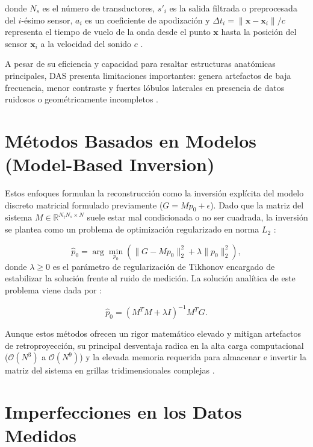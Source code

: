 donde $N_s$ es el número de transductores, $s'_i$ es la salida filtrada o preprocesada del $i$-ésimo sensor, $a_i$ es un coeficiente de apodización y $\Delta t_i = \|\mathbf{x} - \mathbf{x}_i\| / c$ representa el tiempo de vuelo de la onda desde el punto $\mathbf{x}$ hasta la posición del sensor $\mathbf{x}_i$ a la velocidad del sonido $c$ \cite{DiLiscia2026}.

A pesar de su eficiencia y capacidad para resaltar estructuras anatómicas principales, DAS presenta limitaciones importantes: genera artefactos de baja frecuencia, menor contraste y fuertes lóbulos laterales en presencia de datos ruidosos o geométricamente incompletos \cite{DiLiscia2026}.

\section{Métodos Basados en Modelos (Model-Based Inversion)}
Estos enfoques formulan la reconstrucción como la inversión explícita del modelo discreto matricial formulado previamente ($G = M p_0 + \epsilon$). Dado que la matriz del sistema $M \in \mathbb{R}^{N_t N_s \times N}$ suele estar mal condicionada o no ser cuadrada, la inversión se plantea como un problema de optimización regularizado en norma $L_2$ \cite{DiLiscia2026}:

\begin{equation}
    \hat{p}_0 = \arg\min_{p_0} \left( \|G - M p_0\|_2^2 + \lambda \|p_0\|_2^2 \right),
    \label{eq:opt_model_based}
\end{equation}
donde $\lambda \ge 0$ es el parámetro de regularización de Tikhonov encargado de estabilizar la solución frente al ruido de medición. La solución analítica de este problema viene dada por \cite{DiLiscia2026}:

\begin{equation}
    \hat{p}_0 = \left( M^T M + \lambda I \right)^{-1} M^T G.
    \label{eq:solucion_model_based}
\end{equation}

Aunque estos métodos ofrecen un rigor matemático elevado y mitigan artefactos de retroproyección, su principal desventaja radica en la alta carga computacional ($\mathcal{O}(N^3)$ a $\mathcal{O}(N^9)$) y la elevada memoria requerida para almacenar e invertir la matriz del sistema en grillas tridimensionales complejas \cite{DiLiscia2026}.


\section{Imperfecciones en los Datos Medidos}

